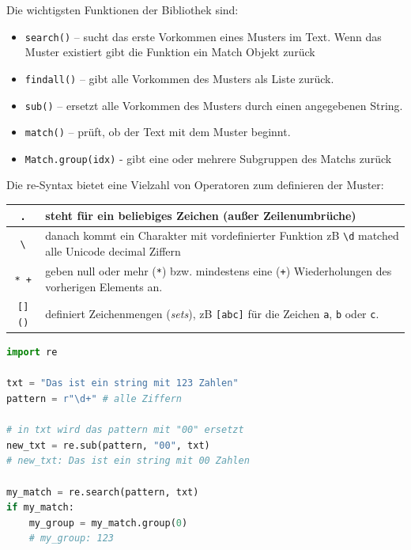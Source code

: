 \documentclass[a4paper, 12pt]{article}
\begin{document}
Die wichtigsten Funktionen der Bibliothek sind:
\begin{itemize}
    \item \texttt{search()} – sucht das erste Vorkommen eines Musters im Text. Wenn das Muster existiert gibt die Funktion ein Match Objekt zurück
    \item \texttt{findall()} – gibt alle Vorkommen des Musters als Liste zurück.
    \item \texttt{sub()} – ersetzt alle Vorkommen des Musters durch einen angegebenen String.
    \item \texttt{match()} – prüft, ob der Text mit dem Muster beginnt.
    	\item \texttt{Match.group(idx)} - gibt eine oder mehrere Subgruppen des Matchs zurück
\end{itemize}

\newpage
Die re-Syntax bietet eine Vielzahl von Operatoren zum definieren der Muster:
\begin{table}[h!]
\centering
\begin{tabular}{|c | >{\arraybackslash}p{11cm}|}
\hline
\texttt{.} & steht für ein beliebiges Zeichen (außer Zeilenumbrüche) \\
\hline
\texttt{\textbackslash} & danach kommt ein Charakter mit vordefinierter Funktion zB \texttt{\textbackslash d}  matched
	alle Unicode decimal Ziffern \\
\hline
\texttt{* +} & geben null oder mehr (\texttt{*}) bzw. mindestens 
	eine (\texttt{+}) Wiederholungen des vorherigen Elements an. \\
\hline
\texttt{[] ()} & definiert Zeichenmengen (\textit{sets}), zB \texttt{[abc]} für die Zeichen 	 
	\texttt{a}, \texttt{b} oder \texttt{c}. \\
\hline
\end{tabular}
\end{table}

\begin{lstlisting}[language=Python, caption=Beispiel für regex Syntax:]
import re

txt = "Das ist ein string mit 123 Zahlen"
pattern = r"\d+" # alle Ziffern

# in txt wird das pattern mit "00" ersetzt
new_txt = re.sub(pattern, "00", txt)
# new_txt: Das ist ein string mit 00 Zahlen

my_match = re.search(pattern, txt)
if my_match:
	my_group = my_match.group(0)
	# my_group: 123
\end{lstlisting} %
\end{document}

